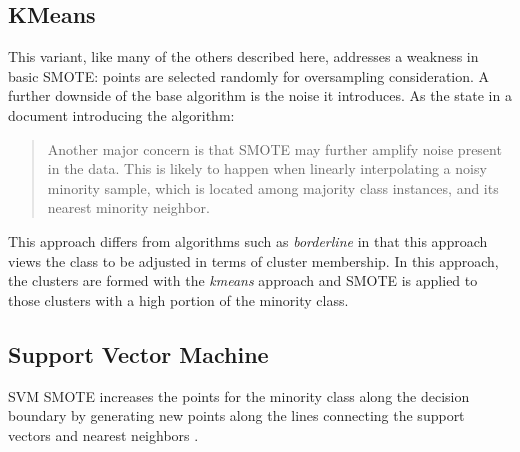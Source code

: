 \documentclass[letterpaper]{article}
\begin{document}
{\subsection{KMeans}
This variant, like many of the others described here, addresses a weakness in basic SMOTE: points are selected randomly for oversampling consideration. A further downside of the base algorithm is the noise it introduces. As the \citeauthor{Last2017-rh} state in a document introducing the algorithm:
\begin{quote}
Another major concern is that SMOTE may further amplify noise present in the data. This is likely
to happen when linearly interpolating a noisy minority sample, which is located among majority class
instances, and its nearest minority neighbor. \parencite{Last2017-rh}
\end{quote}
This approach differs from algorithms such as \textit{borderline} in that this approach views the class to be adjusted in terms of cluster membership.  In this approach, the clusters are formed with the \textit{kmeans} approach and SMOTE is applied to those clusters with a high portion of the minority class.

\subsection{Support Vector Machine}
SVM SMOTE increases the points for the minority class along the decision boundary by generating new points along the lines connecting the support vectors and nearest neighbors \parencite{Nguyen2011-cb}.

}
\end{document}
